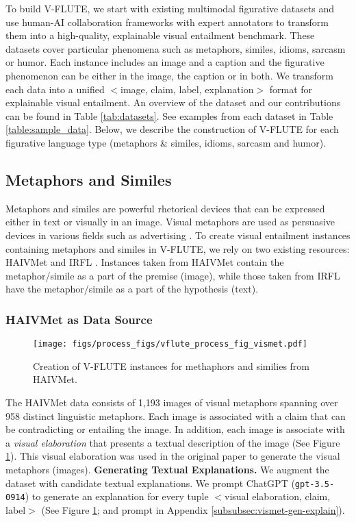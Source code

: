 To build V-FLUTE, we start with existing multimodal figurative datasets and use human-AI collaboration frameworks with expert annotators \cite{chakrabarty-etal-2022-flute, wiegreffe-etal-2022-reframing, liu-etal-2022-wanli} to transform them into a high-quality, explainable visual entailment benchmark. These datasets cover particular phenomena such as metaphors, similes, idioms, sarcasm or humor. Each instance
includes an image and a caption and the figurative phenomenon can be either in the image, the caption or in both. 
We transform each data into a unified  $<$image, claim, label, explanation$>$ format for explainable visual entailment.
An overview of the dataset and our contributions can be found in Table \ref{tab:datasets}. See examples from each dataset in Table \ref{table:sample_data}. Below, we describe the construction of V-FLUTE for each figurative language type (metaphors \& similes, idioms, sarcasm and humor).

\subsection{Metaphors and Similes}
Metaphors and similes are powerful rhetorical devices that can be expressed either in text or visually in an image. Visual metaphors are used as persuasive devices
in various fields such as advertising \cite{forceville2002pictorial, scott1994images}.
To create visual entailment instances containing metaphors and similes in V-FLUTE, we rely on two existing resources: HAIVMet \cite{chakrabarty-etal-2023-spy} and IRFL \cite{yosef-etal-2023-irfl}. Instances taken from HAIVMet contain the metaphor/simile as a part of the premise (image), while those taken from IRFL have the metaphor/simile as a part of the hypothesis (text). 

\subsubsection{HAIVMet as Data Source}

\begin{figure}[!ht]
\centering
    \texttt{[image: figs/process\_figs/vflute\_process\_fig\_vismet.pdf]}
    \caption{Creation of V-FLUTE instances for methaphors and similies from HAIVMet.}
    \label{fig:haivmet}
\end{figure}

The HAIVMet \cite{chakrabarty-etal-2023-spy} data consists of 1,193 images of visual metaphors spanning over 958 distinct linguistic metaphors. Each image is associated with a claim that can be contradicting or entailing the image.  In addition, each image is associate with a \textit{visual elaboration} that presents a textual description of the image (See Figure \ref{fig:haivmet}). This visual elaboration was used in the original paper to generate the visual metaphors (images). 
{\bf Generating Textual Explanations.} We augment the dataset with candidate textual explanations. We prompt ChatGPT (\texttt{gpt-3.5-0914}) to generate an explanation for every tuple $<$visual elaboration, claim, label$>$
(See Figure \ref{fig:haivmet}; and prompt in Appendix \ref{subsubsec:vismet-gen-explain}). 

